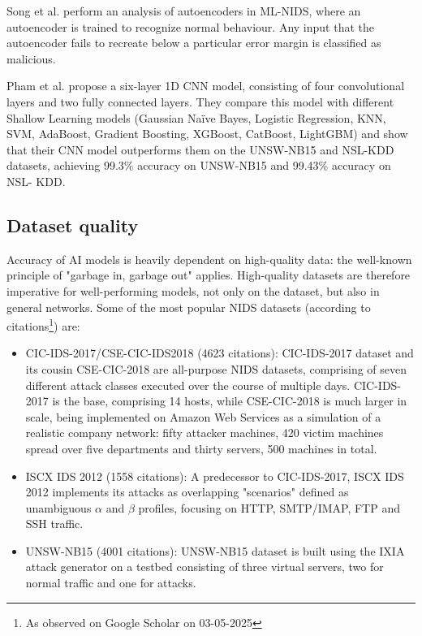 Song et al. \cite{analysis_autoencoders} perform an analysis of autoencoders in ML-NIDS, where an autoencoder is trained to recognize normal behaviour. Any input that the autoencoder fails to recreate below a particular error margin is classified as malicious. 

Pham et al. \cite{nids_cnn} propose a six-layer 1D CNN model, consisting of four convolutional layers and two fully connected layers. They compare this model with different Shallow Learning models (Gaussian Naïve Bayes, Logistic Regression, KNN, SVM, AdaBoost, Gradient Boosting, XGBoost, CatBoost, LightGBM) and show that their CNN model outperforms them on the UNSW-NB15\cite{unsw-nb15} and NSL-KDD \cite{nsl-kdd} datasets, achieving 99.3\% accuracy on UNSW-NB15 and 99.43\% accuracy on NSL- KDD.
\subsection{Dataset quality}
Accuracy of AI models is heavily dependent on high-quality data: the well-known principle of "garbage in, garbage out" applies. High-quality datasets are therefore imperative for well-performing models, not only on the dataset, but also in general networks. Some of the most popular NIDS datasets (according to citations\footnote{As observed on Google Scholar on 03-05-2025}) are:
\begin{itemize}
    \item CIC-IDS-2017/CSE-CIC-IDS2018 \cite{cic_2017, cic_2018} (4623 citations): CIC-IDS-2017 dataset and its cousin CSE-CIC-2018 are all-purpose NIDS datasets, comprising of seven different attack classes executed over the course of multiple days. CIC-IDS-2017 is the base, comprising 14 hosts, while CSE-CIC-2018 is much larger in scale, being implemented on Amazon Web Services as a simulation of a realistic company network: fifty attacker machines, 420 victim machines spread over five departments and thirty servers, 500 machines in total. 
    \item ISCX IDS 2012 \cite{iscx_ids_2012} (1558 citations): A predecessor to CIC-IDS-2017, ISCX IDS 2012 implements its attacks as overlapping "scenarios" defined as unambiguous $\alpha$ and $\beta$ profiles, focusing on HTTP, SMTP/IMAP, FTP and SSH traffic. 
    \item UNSW-NB15 \cite{unsw-nb15} (4001 citations): UNSW-NB15 dataset is built using the IXIA attack generator on a testbed consisting of three virtual servers, two for normal traffic and one for attacks.
\end{itemize}

